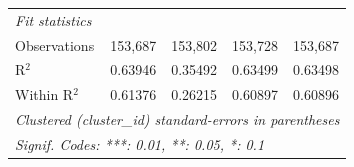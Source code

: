 \begin{tabular}{lcccc}
   \midrule
   \emph{Fit statistics}\\
   Observations               & 153,687         & 153,802         & 153,728         & 153,687\\  
   R$^2$                      & 0.63946         & 0.35492         & 0.63499         & 0.63498\\  
   Within R$^2$               & 0.61376         & 0.26215         & 0.60897         & 0.60896\\  
   \midrule \midrule
   \multicolumn{5}{l}{\emph{Clustered (cluster\_id) standard-errors in parentheses}}\\
   \multicolumn{5}{l}{\emph{Signif. Codes: ***: 0.01, **: 0.05, *: 0.1}}\\
\end{tabular}
\par\endgroup


